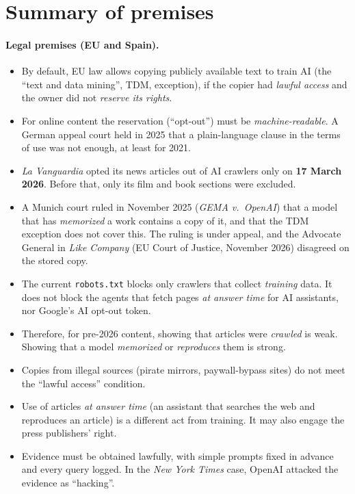 \documentclass[10pt,a4paper]{article}
\begin{document}
\section*{Summary of premises}
\paragraph{Legal premises (EU and Spain).}
\begin{itemize}
\item By default, EU law allows copying publicly available text to train AI (the ``text and data mining'', TDM,
exception), if the copier had \emph{lawful access} and the owner did not \emph{reserve its rights}.
\item For online content the reservation (``opt-out'') must be \emph{machine-readable}. A German appeal court held in
2025 that a plain-language clause in the terms of use was not enough, at least for 2021.
\item \emph{La Vanguardia} opted its news articles out of AI crawlers only on \textbf{17 March 2026}. Before that,
only its film and book sections were excluded.
\item A Munich court ruled in November 2025 (\emph{GEMA v.\ OpenAI}) that a model that has \emph{memorized} a work
contains a copy of it, and that the TDM exception does not cover this. The ruling is under appeal, and the
Advocate General in \emph{Like Company} (EU Court of Justice, November 2026) disagreed on the stored copy.
\item The current \texttt{robots.txt} blocks only crawlers that collect \emph{training} data. It does not block the
agents that fetch pages \emph{at answer time} for AI assistants, nor Google's AI opt-out token.
\item Therefore, for pre-2026 content, showing that articles were \emph{crawled} is weak. Showing that a model
\emph{memorized} or \emph{reproduces} them is strong.
\item Copies from illegal sources (pirate mirrors, paywall-bypass sites) do not meet the ``lawful access'' condition.
\item Use of articles \emph{at answer time} (an assistant that searches the web and reproduces an article) is a
different act from training. It may also engage the press publishers' right.
\item Evidence must be obtained lawfully, with simple prompts fixed in advance and every query logged. In the
\emph{New York Times} case, OpenAI attacked the evidence as ``hacking''.
\end{itemize}
\end{document}
